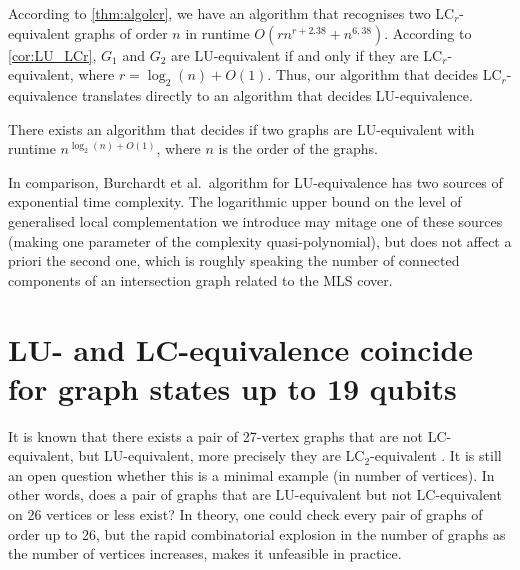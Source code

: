 \documentclass[a4paper,UKenglish,cleveref,autoref,thm-restate]{arxiv}
\begin{document}
According to \cref{thm:algolcr}, we have an algorithm that recognises two LC$_r$-equivalent graphs of order $n$ in runtime $O(r n^{r+2.38} + n^{6,38})$. According to \cref{cor:LU_LCr}, $G_1$ and $G_2$ are LU-equivalent if and only if they are LC$_r$-equivalent, where $r=\log_2(n)+O(1)$. Thus, our algorithm that decides LC$_r$-equivalence translates directly to an algorithm that decides LU-equivalence.

\begin{theorem}
    There exists an algorithm that decides if two graphs are LU-equivalent with runtime $n^{\log_2(n)+O(1)}$, where $n$ is the order of the graphs.
\end{theorem}

In comparison, Burchardt et al.~algorithm for LU-equivalence \cite{burchardt2024algorithmverifylocalequivalence} has two sources of exponential time complexity. The logarithmic upper bound on the level of generalised local complementation we introduce may mitage one of these sources (making one parameter of the complexity quasi-polynomial), but does not affect a priori the second one, which is roughly speaking the number of connected components of an intersection graph related to the MLS cover. 

\section{LU- and LC-equivalence coincide for graph states up to 19 qubits} \label{sec:19qubits}

It is known that there exists a pair of 27-vertex graphs that are not LC-equivalent, but  LU-equivalent, more precisely they are LC$_2$-equivalent \cite{Ji07,Tsimakuridze17}. It is still  an open question whether this is a minimal example (in number of vertices). In other words, does a pair of graphs that are LU-equivalent but not LC-equivalent on 26 vertices or less exist? In theory, one could check every pair of graphs of order up to 26, but the rapid combinatorial explosion in the number of graphs as the number of vertices increases, makes it unfeasible in practice.
\end{document}
